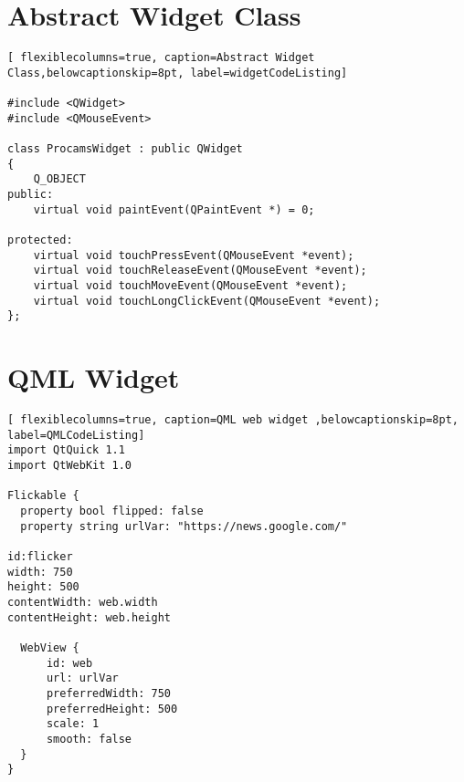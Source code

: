\section{Abstract Widget Class}
\begin{lstlisting}[ flexiblecolumns=true, caption=Abstract Widget Class,belowcaptionskip=8pt, label=widgetCodeListing]

#include <QWidget>
#include <QMouseEvent>

class ProcamsWidget : public QWidget
{
    Q_OBJECT
public:
    virtual void paintEvent(QPaintEvent *) = 0;

protected:
    virtual void touchPressEvent(QMouseEvent *event);
    virtual void touchReleaseEvent(QMouseEvent *event);
    virtual void touchMoveEvent(QMouseEvent *event);
    virtual void touchLongClickEvent(QMouseEvent *event);
};
\end{lstlisting}

\newpage
\section{QML Widget}
\begin{lstlisting}[ flexiblecolumns=true, caption=QML web widget ,belowcaptionskip=8pt, label=QMLCodeListing]
import QtQuick 1.1
import QtWebKit 1.0

Flickable {
  property bool flipped: false
  property string urlVar: "https://news.google.com/"

id:flicker
width: 750
height: 500
contentWidth: web.width
contentHeight: web.height

  WebView {
      id: web
      url: urlVar
      preferredWidth: 750
      preferredHeight: 500
      scale: 1
      smooth: false
  }
}
\end{lstlisting}